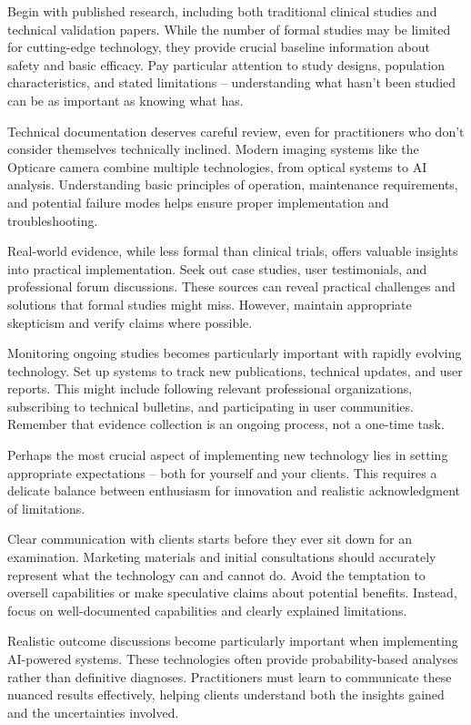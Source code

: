 \documentclass[
  Letterpaper,
]{scrbook}
\begin{document}
Begin with published research, including both traditional clinical
studies and technical validation papers. While the number of formal
studies may be limited for cutting-edge technology, they provide crucial
baseline information about safety and basic efficacy. Pay particular
attention to study designs, population characteristics, and stated
limitations -- understanding what hasn't been studied can be as
important as knowing what has.

Technical documentation deserves careful review, even for practitioners
who don't consider themselves technically inclined. Modern imaging
systems like the Opticare camera combine multiple technologies, from
optical systems to AI analysis. Understanding basic principles of
operation, maintenance requirements, and potential failure modes helps
ensure proper implementation and troubleshooting.

Real-world evidence, while less formal than clinical trials, offers
valuable insights into practical implementation. Seek out case studies,
user testimonials, and professional forum discussions. These sources can
reveal practical challenges and solutions that formal studies might
miss. However, maintain appropriate skepticism and verify claims where
possible.

Monitoring ongoing studies becomes particularly important with rapidly
evolving technology. Set up systems to track new publications, technical
updates, and user reports. This might include following relevant
professional organizations, subscribing to technical bulletins, and
participating in user communities. Remember that evidence collection is
an ongoing process, not a one-time task.

Perhaps the most crucial aspect of implementing new technology lies in
setting appropriate expectations -- both for yourself and your clients.
This requires a delicate balance between enthusiasm for innovation and
realistic acknowledgment of limitations.

Clear communication with clients starts before they ever sit down for an
examination. Marketing materials and initial consultations should
accurately represent what the technology can and cannot do. Avoid the
temptation to oversell capabilities or make speculative claims about
potential benefits. Instead, focus on well-documented capabilities and
clearly explained limitations.

Realistic outcome discussions become particularly important when
implementing AI-powered systems. These technologies often provide
probability-based analyses rather than definitive diagnoses.
Practitioners must learn to communicate these nuanced results
effectively, helping clients understand both the insights gained and the
uncertainties involved.
\end{document}

